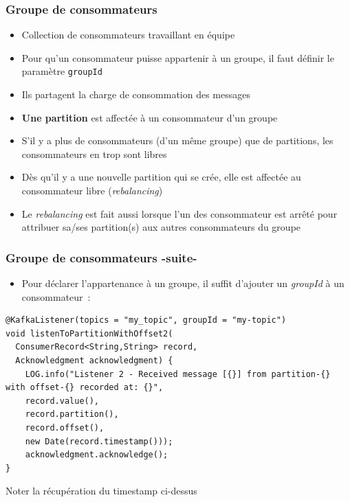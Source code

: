 \documentclass{beamer}
\begin{document}
\begin{frame}[fragile]
	\frametitle{Groupe de consommateurs}
	\begin{itemize}
		\item Collection de consommateurs travaillant en équipe
		\item Pour qu'un consommateur puisse appartenir à un groupe, il faut définir le paramètre \texttt{groupId}
		\item Ils partagent la charge de consommation des messages
		\item \textbf{Une partition} est affectée à un consommateur d'un groupe
		\item S'il y a plus de consommateurs (d'un même groupe) que de partitions, les consommateurs en trop sont libres
		\item Dès qu'il y a une nouvelle partition qui se crée, elle est affectée au consommateur libre (\textit{rebalancing})
		\item Le \textit{rebalancing} est fait aussi lorsque l'un des consommateur est arrêté pour attribuer sa/ses partition(s) aux autres consommateurs du groupe
	\end{itemize}
\end{frame} 

\begin{frame}[fragile]
	\frametitle{Groupe de consommateurs -suite-}
	\begin{itemize}
		\item Pour déclarer l'appartenance à un groupe, il suffit d'ajouter un \textit{groupId} à un consommateur~:
	\end{itemize}
\begin{lstlisting}
@KafkaListener(topics = "my_topic", groupId = "my-topic")
void listenToPartitionWithOffset2(
  ConsumerRecord<String,String> record,
  Acknowledgment acknowledgment) {
	LOG.info("Listener 2 - Received message [{}] from partition-{} with offset-{} recorded at: {}",
	record.value(),
	record.partition(),
	record.offset(),
	new Date(record.timestamp()));
	acknowledgment.acknowledge();
}
\end{lstlisting}
Noter la récupération du timestamp ci-dessus
\end{frame} 
\end{document}
